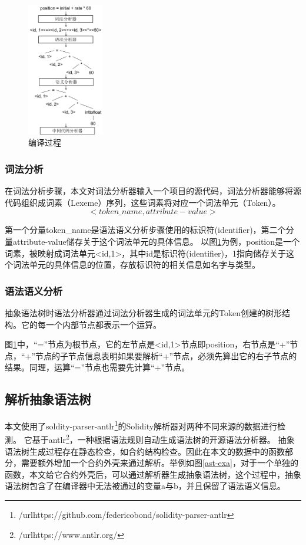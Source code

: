 \begin{figure}[htbp]
\centering
\includegraphics[width=0.3\textwidth]{figures/AST.png}
\caption{编译过程}
\label{cpl}
\end{figure}

\subsubsection{词法分析}

在词法分析步骤，本文对词法分析器输入一个项目的源代码，词法分析器能够将源代码组织成词素（Lexeme）序列，这些词素将对应一个词法单元（Token）。
\[<token\_name, attribute-value> \]

第一个分量token\_name是语法语义分析步骤使用的标识符(identifier)，第二个分量attribute-value储存关于这个词法单元的具体信息。
以图\ref{cpl}为例，position是一个词素，被映射成词法单元<id,1>，其中id是标识符(identifier)，1指向储存关于这个词法单元的具体信息的位置，存放标识符的相关信息如名字与类型。

\subsubsection{语法语义分析}

抽象语法树时语法分析器通过词法分析器生成的词法单元的Token创建的树形结构。它的每一个内部节点都表示一个运算。

图\ref{cpl}中，“=”节点为根节点，它的左节点是<id,1>节点即position，右节点是“+”节点，“+”节点的子节点信息表明如果要解析“+”节点，必须先算出它的右子节点的结果。同理，运算“=”节点也需要先计算“+”节点。

\subsection{解析抽象语法树}

本文使用了soldity-parser-antlr\footnote{/url{https://github.com/federicobond/solidity-parser-antlr}}的Solidity解析器对两种不同来源的数据进行检测。
它基于antlr\footnote{/url{https://www.antlr.org/}}，一种根据语法规则自动生成语法树的开源语法分析器。
抽象语法树生成过程存在静态检查，如合约结构检查。因此在本文的数据中的函数部分，需要额外增加一个合约外壳来通过解析。举例如图\ref{ast-exa}，对于一个单独的函数，本文给它合约外壳后，可以通过解析器生成抽象语法树，这个过程中，抽象语法树包含了在编译器中无法被通过的变量a与b，并且保留了语法语义信息。

